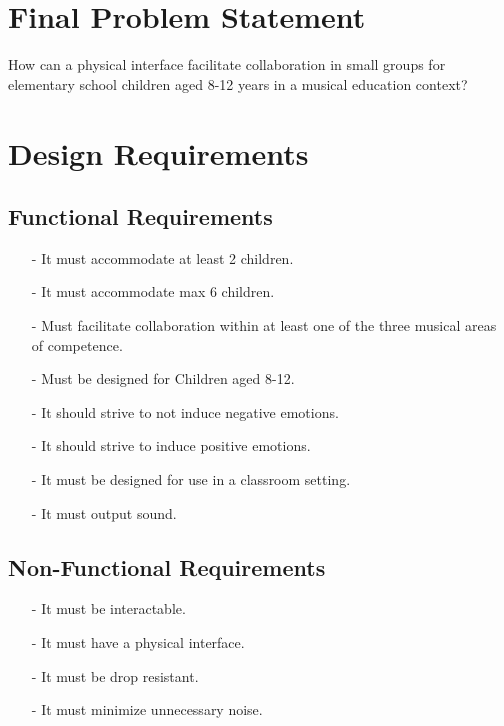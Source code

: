 
\section{Final Problem Statement}\label{sec:FPS}
	How can a physical interface facilitate collaboration in small groups for elementary school children aged 8-12 years in a musical education context?
	
\section{Design Requirements}\label{sec:DRequirements}
	\subsection*{Functional Requirements}
		\begin{itemize}
			\item[-] It must accommodate at least 2 children.\\
			\item[-] It must accommodate max 6 children.\\
			\item[-] Must facilitate collaboration within at least one of the three musical areas of competence.\\
			\item[-] Must be designed for Children aged 8-12.\\
			\item[-] It should strive to not induce  negative emotions.\\
			\item[-] It should strive to induce positive emotions.\\
			\item[-] It must be designed for use in a classroom setting.\\
			\item[-] It must output sound.		
			
		\end{itemize}
	\subsection*{Non-Functional Requirements}
		\begin{itemize}
			\item[-] It must be interactable.\\
			\item[-] It must have a physical interface.\\
			\item[-] It must be drop resistant.\\
			\item[-] It must minimize unnecessary noise.
		\end{itemize}
	
















		